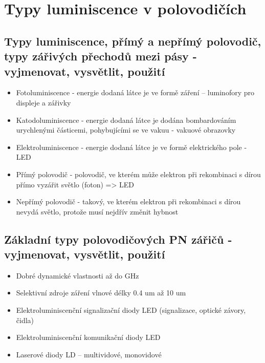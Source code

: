 \documentclass[a4paper, 12pt]{article}
\begin{document}
    \section{Typy luminiscence v polovodičích}
        \subsection{Typy luminiscence, přímý a nepřímý polovodič, typy zářivých přechodů mezi pásy - vyjmenovat, vysvětlit, použití}
            \begin{itemize}
                \item Fotoluminiscence - energie dodaná látce je ve formě záření – luminofory pro displeje a zářivky
                \item Katodoluminiscence - energie dodaná látce je dodána bombardováním urychlenými částicemi, pohybujícími se ve vakuu - vakuové obrazovky
                \item Elektroluminiscence - energie dodaná látce je ve formě elektrického pole - LED
                \item Přímý polovodič - polovodič, ve kterém může elektron při rekombinaci s dírou přímo vyzářit světlo (foton) => LED
                \item Nepřímý polovodič - takový, ve kterém elektron při rekombinaci s dírou nevydá světlo, protože musí nejdřív změnit hybnost
            \end{itemize}
        \subsection{Základní typy polovodičových PN zářičů - vyjmenovat, vysvětlit, použití}
            \begin{itemize}
                \item Dobré dynamické vlastnosti až do GHz
                \item Selektivní zdroje záření vlnové délky 0.4 um až 10 um
                \item Elektroluminiscenční signalizační diody LED (signalizace, optické závory, čidla)
                \item Elektroluminiscenční komunikační diody LED
                \item Laserové diody LD – multividové, monovidové
            \end{itemize}
        
\end{document}
